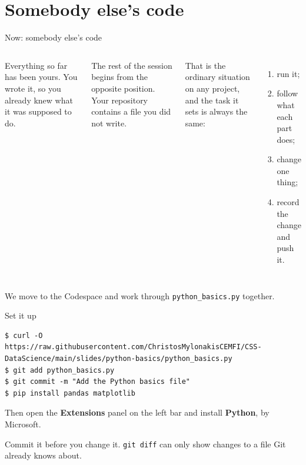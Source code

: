 \documentclass[aspectratio=169,11pt]{beamer}
\begin{document}
\section{Somebody else's code}

\begin{frame}{Now: somebody else's code}
\begin{columns}[T,onlytextwidth]
  Everything so far has been yours. You wrote it, so you already knew what it
  was supposed to do.
  \vspace{0.7em}

  The rest of the session begins from the opposite position. Your repository
  contains a file you did not write.

  That is the ordinary situation on any project, and the task it sets is always
  the same:
  \begin{enumerate}
    \item run it;
    \item follow what each part does;
    \item change one thing;
    \item record the change and push it.
  \end{enumerate}
\end{columns}

\vspace{1.0em}
\begin{center}
  We move to the Codespace and work through \texttt{python\_basics.py} together.
\end{center}
\end{frame}

\begin{frame}[fragile]{Set it up}
\begin{lstlisting}[style=terminalsmall]
$ curl -O https://raw.githubusercontent.com/ChristosMylonakisCEMFI/CSS-DataScience/main/slides/python-basics/python_basics.py
$ git add python_basics.py
$ git commit -m "Add the Python basics file"
$ pip install pandas matplotlib
\end{lstlisting}

\vspace{1.0em}
Then open the \textbf{Extensions} panel on the left bar and install
\textbf{Python}, by Microsoft.

\vspace{1.0em}
Commit it before you change it. \texttt{git diff} can only show changes to a
file Git already knows about.
\end{frame}
\end{document}
